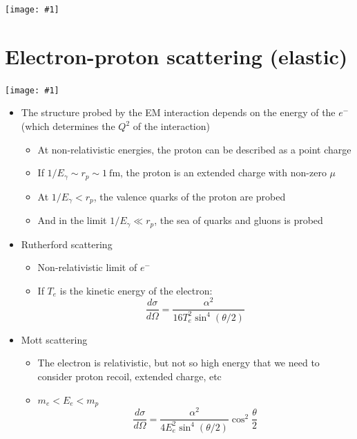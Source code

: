 \documentclass[11pt]{article}
\newcommand{\dd}[2]{\dfrac{d #1}{d #2}}
\newcommand{\fm}{\text{fm}}
\newcommand{\el}{\ensuremath{e^{-}}\xspace}
\newcommand{\embedimgw}[2]{\begin{center}\texttt{[image: \#1]}\end{center}}
\begin{document}
\embedimgw{figs/ee_xsec.png}{.8}

\section{Electron-proton scattering (elastic)}
\embedimgw{figs/epranges.png}{.5}
\begin{itemize}
  \item The structure probed by the EM interaction depends on the energy of the \el (which determines the $Q^2$ of the interaction)
  \begin{itemize}
    \item At non-relativistic energies, the proton can be described as a point charge
    \item If $1/E_\gamma \sim r_p \sim 1~\fm$, the proton is an extended charge with non-zero $\mu$
    \item At $1/E_\gamma < r_p$, the valence quarks of the proton are probed
    \item And in the limit $1/E_\gamma \ll r_p$, the sea of quarks and gluons is probed
  \end{itemize}
  \item Rutherford scattering
  \begin{itemize}
    \item Non-relativistic limit of \el
    \item If $T_e$ is the kinetic energy of the electron:
    \begin{equation}
      \dd\sigma\Omega = \dfrac{\alpha^2}{16 T_e^2\sin^4(\theta/2)}
    \end{equation}
  \end{itemize}
  \item Mott scattering
  \begin{itemize}
    \item The electron is relativistic, but not so high energy that we need to consider proton recoil, extended charge, etc
    \item $m_e < E_e < m_p$
    \begin{equation}
      \dd\sigma\Omega = \dfrac{\alpha^2}{4E_e^2\sin^4(\theta/2)}\cos^2\frac\theta 2
    \end{equation}
  \end{itemize}
\end{itemize}
\end{document}
